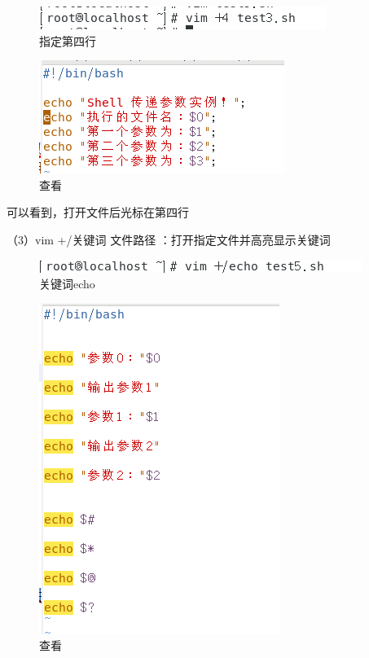 \documentclass{ctexart}
\begin{document}
	\begin{figure}[H]
		\centering
		\includegraphics{2.35}
		\caption{指定第四行}
	\end{figure}
	
	\begin{figure}[H]
		\centering
		\includegraphics{2.34}
		\caption{查看}
	\end{figure}
	
	可以看到，打开文件后光标在第四行
	
	
	（3）vim +/关键词 文件路径 ：打开指定文件并高亮显示关键词
	
	\begin{figure}[H]
		\centering
		\includegraphics{2.37}
		\caption{关键词echo}
	\end{figure}
	
	\begin{figure}[H]
		\centering
		\includegraphics{2.36}
		\caption{查看}
	\end{figure}
	
\end{document}
